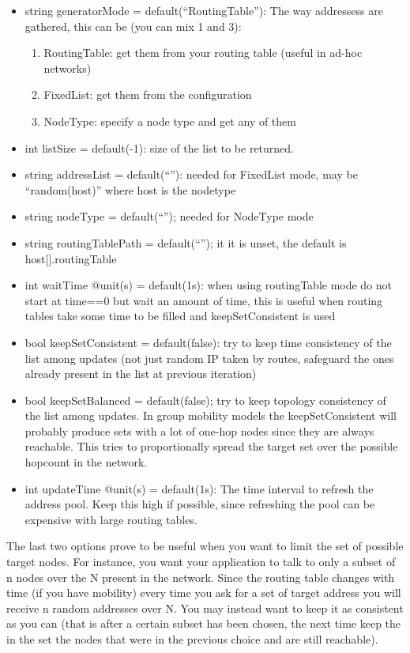 \documentclass[12pt, a4]{article}
\theoremstyle{definition}
\begin{document}
\begin{itemize}
\item    string generatorMode = default(“RoutingTable”):  The way addressess are
gathered, this can be (you can mix 1 and 3):
\begin{enumerate}
\item        RoutingTable: get them from your routing table (useful in ad-hoc networks)
\item        FixedList: get them from the configuration
\item        NodeType: specify a node type and get any of them
\end{enumerate}
\item    int listSize = default(-1):  size of the list to be returned.
\item    string addressList = default(“”): needed for FixedList mode, may be “random(host)” where host is the nodetype
\item    string nodeType = default(“”); needed for NodeType mode
\item    string routingTablePath = default(“”); it it is unset, the default is host[].routingTable
\item    int waitTime @unit(s) = default(1s):  when using routingTable mode do not start at time==0 but wait an amount of time, this is useful when routing tables take some time to be filled and keepSetConsistent is used
\item    bool keepSetConsistent = default(false): try to keep time consistency of the list among updates (not just random IP taken by routes, safeguard the ones already present in the list at previous iteration)
\item    bool keepSetBalanced = default(false); try to keep topology consistency of the list among updates. In group mobility models the keepSetConsistent will probably produce sets with a lot of one-hop nodes since they are always reachable. This tries to proportionally spread the target set over the possible hopcount in the network.
\item    int updateTime @unit(s) = default(1s): The time interval to refresh the address pool. Keep this high if possible, since refreshing the pool can be expensive with large routing tables.
\end{itemize}

The last two options prove to be useful when you want to limit the set of
possible target nodes. For instance, you want your application to talk to only a
subset of n nodes over the N present in the network. Since the routing table changes with time (if
you have mobility) every time you ask for a set of target address you will
receive  n random addresses over N. You may instead want to keep it as
consistent as you can (that is after a certain subset has been chosen, the next
time keep the in the set the nodes that were in the previous choice and are
still reachable). 
\end{document}
